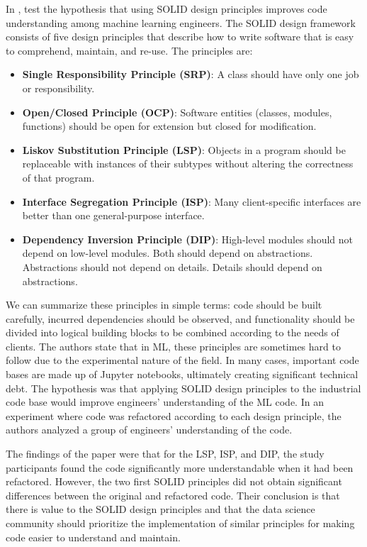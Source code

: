 \documentclass[a4paper, 11pt]{article}
\begin{document}
In \cite{cabral_investigating_2024}, test the hypothesis that using SOLID design principles improves code understanding among machine learning engineers. The SOLID design framework consists of five design principles that describe how to write software that is easy to comprehend, maintain, and re-use. The principles are:
\begin{itemize}
    \item \textbf{Single Responsibility Principle (SRP)}: A class should have only one job or responsibility.
    \item \textbf{Open/Closed Principle (OCP)}: Software entities (classes, modules, functions) should be open for extension but closed for modification.
    \item \textbf{Liskov Substitution Principle (LSP)}: Objects in a program should be replaceable with instances of their subtypes without altering the correctness of that program.
    \item \textbf{Interface Segregation Principle (ISP)}: Many client-specific interfaces are better than one general-purpose interface.
    \item \textbf{Dependency Inversion Principle (DIP)}: High-level modules should not depend on low-level modules. Both should depend on abstractions. Abstractions should not depend on details. Details should depend on abstractions.
\end{itemize}

We can summarize these principles in simple terms: code should be built carefully, incurred dependencies should be observed, and functionality should be divided into logical building blocks to be combined according to the needs of clients. The authors state that in ML, these principles are sometimes hard to follow due to the experimental nature of the field. In many cases, important code bases are made up of Jupyter notebooks, ultimately creating significant technical debt. The hypothesis was that applying SOLID design principles to the industrial code base would improve engineers' understanding of the ML code. In an experiment where code was refactored according to each design principle, the authors analyzed a group of engineers' understanding of the code. 

The findings of the paper were that for the LSP, ISP, and DIP, the study participants found the code significantly more understandable when it had been refactored. However, the two first SOLID principles did not obtain significant differences between the original and refactored code. Their conclusion is that there is value to the SOLID design principles and that the data science community should prioritize the implementation of similar principles for making code easier to understand and maintain.  
\end{document}
